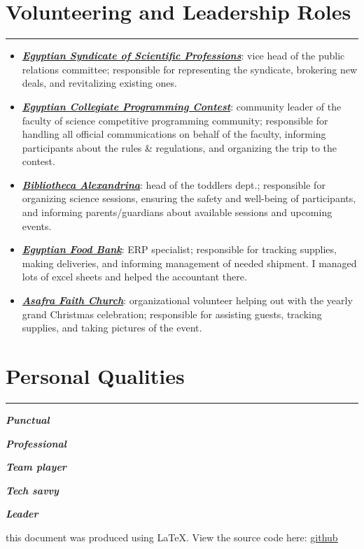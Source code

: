 \documentclass[10pt]{article}
\newcommand{\fancy}[1]{\Large\textbf{\textit{#1}}}
\begin{document}

\section*{Volunteering and Leadership Roles}
\hrule
\vspace{1em}
\begin{itemize}
	\item \fancy{\href{https://www.linkedin.com/company/syndicate-of-scientific-professions-alexandria-نقابة-المهن-العلمية-الإسكندرية/}{Egyptian Syndicate of Scientific Professions}}: vice head of the public relations committee; responsible for representing the syndicate, brokering new deals, and revitalizing existing ones.
	\item \fancy{\href{https://www.linkedin.com/showcase/ecpc-egyptian-collegiate-programming-contest1/}{Egyptian Collegiate Programming Contest}}: community leader of the faculty of science competitive programming community; responsible for handling all official communications on behalf of the faculty, informing participants about the rules \& regulations, and organizing the trip to the contest.
	\item \fancy{\href{https://www.linkedin.com/company/bibalexofficial/}{Bibliotheca Alexandrina}}: head of the toddlers dept.; responsible for organizing science sessions, ensuring the safety and well-being of participants, and informing parents/guardians about available sessions and upcoming events.
	\item \fancy{\href{https://www.linkedin.com/company/egyptian-food-bank/}{Egyptian Food Bank}}: ERP specialist; responsible for tracking supplies, making deliveries, and informing management of needed shipment. I managed lots of excel sheets and helped the accountant there.
	\item \fancy{\href{https://www.linkedin.com/company/asafra-faith-church/}{Asafra Faith Church}}: organizational volunteer helping out with the yearly grand Christmas celebration; responsible for assisting guests, tracking supplies, and taking pictures of the event.
\end{itemize}

\section*{Personal Qualities}
\hrule
\vspace{1em}
\begin{itemize*}
\item \fancy{Punctual \quad\quad}
\item \fancy{Professional \quad\quad}
\item \fancy{Team player \quad\quad}
\item \fancy{Tech savvy \quad\quad}
\item \fancy{Leader}
\end{itemize*}

\begin{center}
	{\tiny this document was produced using \LaTeX. View the source code here: \href{https://github.com/aaamw2000/myLaTeX/tree/main/pii/myCV}{github}}
\end{center}
\end{document}
